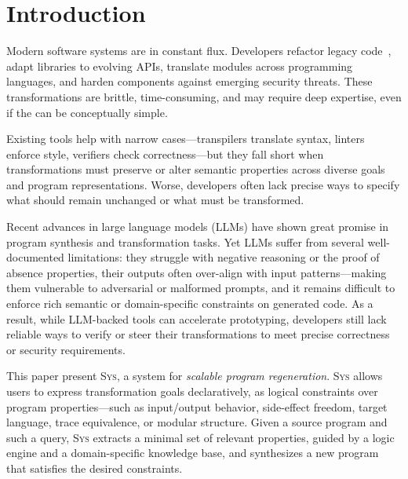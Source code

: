 \documentclass[sigplan]{acmart}
\newcommand{\sys}{{\scshape Sys}\xspace}
\begin{document}
\section{Introduction}

Modern software systems are in constant flux.
Developers refactor legacy code~\cite{Fowler99,Mens04},
adapt libraries to evolving APIs,
translate modules across programming languages,
and harden components against emerging security threats.
These transformations are brittle, time-consuming, and may require deep expertise,
even if the can be conceptually simple.

Existing tools help with narrow cases---transpilers translate syntax, linters
enforce style, verifiers check correctness---but they fall short when
transformations must preserve or alter semantic properties across diverse goals
and program representations. 
Worse, developers often lack precise ways to
specify what should remain unchanged or what must be transformed.

Recent advances in large language models (LLMs) have shown great promise in
program synthesis and transformation tasks.
Yet LLMs suffer from several well-documented limitations:
they struggle with negative reasoning or the proof of absence properties, their outputs often over-align with input patterns---making
them vulnerable to adversarial or malformed prompts, and it
remains difficult to enforce rich semantic or domain-specific constraints on
generated code.
As a result, while LLM-backed tools can
accelerate prototyping, developers still lack reliable ways to verify or steer
their transformations to meet precise correctness or security requirements.



This paper present \sys, a system for \emph{scalable program regeneration}.
\sys allows users
to express transformation goals declaratively, as logical constraints over
program properties---such as input/output behavior, side-effect freedom, target
language, trace equivalence, or modular structure. Given a source program and
such a query, \sys extracts a minimal set of relevant properties, guided by a
logic engine and a domain-specific knowledge base, and synthesizes a new
program that satisfies the desired constraints.
\end{document}
